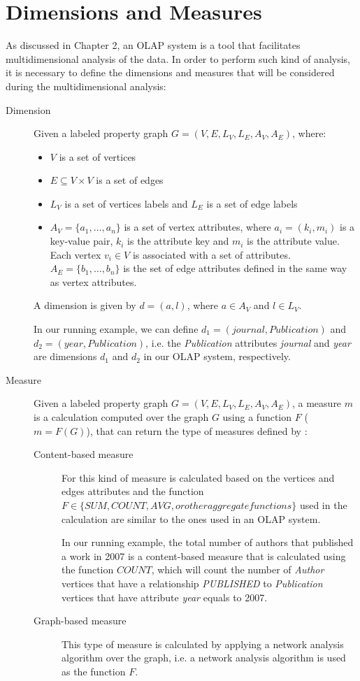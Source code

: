 \section{Dimensions and Measures}

As discussed in Chapter 2, an OLAP system is a tool that facilitates multidimensional analysis of the data. In order to perform such kind of analysis, it is necessary to define the dimensions and measures that will be considered during the multidimensional analysis:
\begin{description}
\item[Dimension] Given a labeled property graph $G = (V, E, L_V, L_E, A_V, A_E)$, where:
\begin{itemize}
\item $V$ is a set of vertices
\item $E \subseteq V \times V$ is a set of edges 
\item $L_V$ is a set of vertices labels and $L_E$ is a set of edge labels
\item $A_V = \{a_1, \dots, a_n\}$ is a set of vertex attributes, where $a_i = (k_i, m_i)$ is a key-value pair, $k_i$ is the attribute key and $m_i$ is the attribute value. Each vertex $v_i \in V$ is associated with a set of attributes. $A_E = \{b_1, \dots, b_n\}$ is the set of edge attributes defined in the same way as vertex attributes.
\end{itemize}
 A dimension is given by $d = (a, l)$, where $a \in A_V$ and $l \in L_V$. 

In our running example, we can define $d_1 = (journal, Publication)$ and $d_2 = (year, Publication)$, i.e. the \emph{Publication} attributes \emph{journal} and \emph{year} are dimensions $d_1$ and $d_2$ in our OLAP system, respectively.

\item[Measure] Given a labeled property graph $G = (V, E, L_V, L_E, A_V, A_E)$, a measure $m$ is a calculation computed over the graph $G$ using a function $F$ ($m=F(G)$), that can return the type of measures defined by  \cite{ghrab2015framework}:
\begin{description}
\item[Content-based measure] For this kind of measure is calculated based on the vertices and edges attributes and the function $F \in \{SUM, COUNT, AVG, or other aggregate functions\}$ used in the calculation are similar to the ones used in an OLAP system. 

In our running example, the total number of authors that published a work in 2007 is a content-based measure that is calculated using the function $COUNT$, which will count the number of \emph{Author} vertices that have a relationship \emph{PUBLISHED} to \emph{Publication} vertices that have attribute \emph{year} equals to 2007.
\item[Graph-based measure] This type of measure is calculated by applying a network analysis algorithm over the graph, i.e. a network analysis algorithm is used as the function $F$. 


\end{description}
\end{description}
